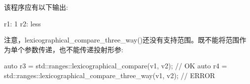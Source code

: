 该程序应有以下输出:

\begin{shell}
r1: 1
r2: less
\end{shell}

注意，lexicographical\_compare\_three\_way()还没有支持范围。既不能将范围作为单个参数传递，也不能传递投射形参:

\begin{cpp}
auto r3 = std::ranges::lexicographical_compare(v1, v2); // OK
auto r4 = std::ranges::lexicographical_compare_three_way(v1, v2); // ERROR
\end{cpp}




